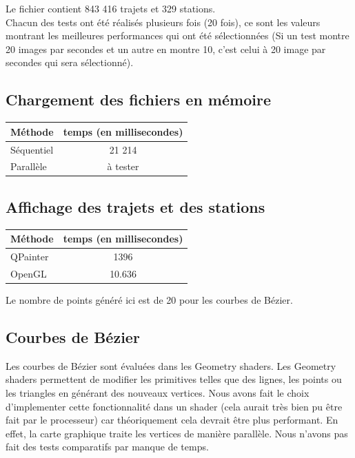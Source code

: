 \documentclass[12pt]{article}
\begin{document}
		Le fichier contient 843 416 trajets et 329 stations. \\
		
		Chacun des tests ont été réalisés plusieurs fois (20 fois), ce
		sont les valeurs montrant les meilleures performances qui ont été
		sélectionnées (Si un test montre 20 images par secondes et un autre en montre
		10, c'est celui à 20 image par secondes qui sera sélectionné).
	    
		\subsection{Chargement des fichiers en mémoire}		
		\begin{center}
			\begin{tabular}{| l | c |}
			\hline
			\textbf{Méthode} & \textbf{temps (en millisecondes)} \\ \hline
			Séquentiel & 21 214 \\ \hline
			Parallèle & à tester \\ \hline
		    \end{tabular}
	    \end{center}
		
		\subsection{Affichage des trajets et des stations}
		\begin{center}
			\begin{tabular}{| l | c |}
			\hline
			\textbf{Méthode} & \textbf{temps (en millisecondes)} \\ \hline
			QPainter & 1396 \\ \hline
			OpenGL & 10.636 \\ \hline
		    \end{tabular}
	    \end{center}
	    
	    Le nombre de points généré ici est de 20 pour les courbes de Bézier.\\
	    	    
	    \subsection{Courbes de Bézier}
		Les courbes de Bézier sont évaluées dans les Geometry shaders. Les Geometry shaders
		permettent de modifier les primitives telles que des lignes, les points ou les triangles
		en générant des nouveaux vertices. Nous avons fait le choix d'implementer cette 
		fonctionnalité dans un shader (cela aurait très bien pu être fait par le processeur)
		car théoriquement cela devrait être plus performant. En effet, la carte graphique
		traite les vertices de manière parallèle. Nous n'avons pas fait des tests
		comparatifs par manque de temps.\\
	    
\end{document}
